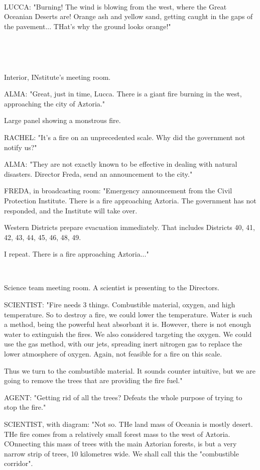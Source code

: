 \documentclass[11pt]{article}
\begin{document}
\ 

LUCCA: "Burning!
The wind is blowing from the west, where the Great Oceanian Deserts are! 
Orange ash and yellow sand, getting caught in the gaps of the pavement...
THat's why the ground looks orange!"

\ 

\ 

Interior, INstitute's meeting room.

ALMA: "Great, just in time, Lucca. 
There is a giant fire burning in the west, approaching the city of Aztoria."

Large panel showing a monstrous fire.

RACHEL: "It's a fire on an unprecedented scale. Why did the government not notify us?"

ALMA: "They are not exactly known to be effective in dealing with natural disasters. Director Freda, send an announcement to the city."

FREDA, in broadcasting room: "Emergency announcement from the Civil Protection Institute. 
There is a fire approaching Aztoria.
The government has not responded, and the Institute will take over.

Western Districts prepare evacuation immediately. 
That includes Districts 40, 41, 42, 43, 44, 45, 46, 48, 49.

I repeat. 
There is a fire approaching Aztoria..."

\ 

Science team meeting room. 
A scientist is presenting to the Directors.

SCIENTIST: "Fire needs 3 things.
Combustible material, oxygen, and high temperature.
So to destroy a fire, we could lower the temperature.
Water is such a method, being the powerful heat absorbant it is.
However, there is not enough water to extinguish the fires.
We also considered targeting the oxygen.
We could use the gas method, with our jets, spreading inert nitrogen gas to replace the lower atmosphere of oxygen.
Again, not feasible for a fire on this scale.

Thus we turn to the combustible material.
It sounds counter intuitive, but we are going to remove the trees that are providing the fire fuel."

AGENT: "Getting rid of all the trees? Defeats the whole purpose of trying to stop the fire."

SCIENTIST, with diagram: "Not so.
THe land mass of Oceania is mostly desert.
THe fire comes from a relatively small forest mass to the west of Aztoria.
COnnecting this mass of trees with the main Aztorian forests, is but a very narrow strip of trees, 10 kilometres wide. 
We shall call this the "combustible corridor".
\end{document}
